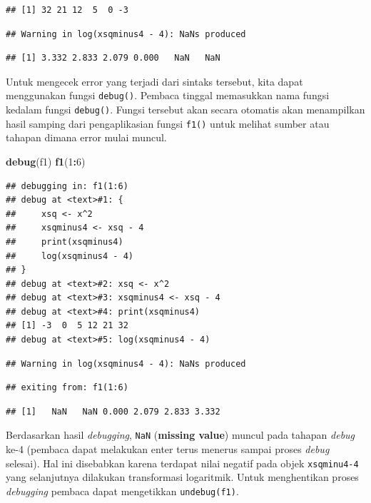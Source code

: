 \documentclass[]{book}
\newenvironment{Shaded}{\begin{snugshade}}{\end{snugshade}}
\newcommand{\DecValTok}[1]{\textcolor[rgb]{0.00,0.00,0.81}{#1}}
\newcommand{\KeywordTok}[1]{\textcolor[rgb]{0.13,0.29,0.53}{\textbf{#1}}}
\newcommand{\NormalTok}[1]{#1}
\newcommand{\OperatorTok}[1]{\textcolor[rgb]{0.81,0.36,0.00}{\textbf{#1}}}
\theoremstyle{definition}
\theoremstyle{definition}
\theoremstyle{definition}
\theoremstyle{remark}
\begin{document}
\begin{verbatim}
## [1] 32 21 12  5  0 -3
\end{verbatim}

\begin{verbatim}
## Warning in log(xsqminus4 - 4): NaNs produced
\end{verbatim}

\begin{verbatim}
## [1] 3.332 2.833 2.079 0.000   NaN   NaN
\end{verbatim}

Untuk mengecek error yang terjadi dari sintaks tersebut, kita dapat menggunakan fungsi \texttt{debug()}. Pembaca tinggal memasukkan nama fungsi kedalam fungsi \texttt{debug()}. Fungsi tersebut akan secara otomatis akan menampilkan hasil samping dari pengaplikasian fungsi \texttt{f1()} untuk melihat sumber atau tahapan dimana error mulai muncul.

\begin{Shaded}
\begin{Highlighting}[]
\KeywordTok{debug}\NormalTok{(f1)}
\KeywordTok{f1}\NormalTok{(}\DecValTok{1}\OperatorTok{:}\DecValTok{6}\NormalTok{)}
\end{Highlighting}
\end{Shaded}

\begin{verbatim}
## debugging in: f1(1:6)
## debug at <text>#1: {
##     xsq <- x^2
##     xsqminus4 <- xsq - 4
##     print(xsqminus4)
##     log(xsqminus4 - 4)
## }
## debug at <text>#2: xsq <- x^2
## debug at <text>#3: xsqminus4 <- xsq - 4
## debug at <text>#4: print(xsqminus4)
## [1] -3  0  5 12 21 32
## debug at <text>#5: log(xsqminus4 - 4)
\end{verbatim}

\begin{verbatim}
## Warning in log(xsqminus4 - 4): NaNs produced
\end{verbatim}

\begin{verbatim}
## exiting from: f1(1:6)
\end{verbatim}

\begin{verbatim}
## [1]   NaN   NaN 0.000 2.079 2.833 3.332
\end{verbatim}

Berdasarkan hasil \emph{debugging}, \texttt{NaN} (\textbf{missing value}) muncul pada tahapan \emph{debug} ke-4 (pembaca dapat melakukan enter terus menerus sampai proses \emph{debug} selesai). Hal ini disebabkan karena terdapat nilai negatif pada objek \texttt{xsqminu4-4} yang selanjutnya dilakukan transformasi logaritmik. Untuk menghentikan proses \emph{debugging} pembaca dapat mengetikkan \texttt{undebug(f1)}.
\end{document}
